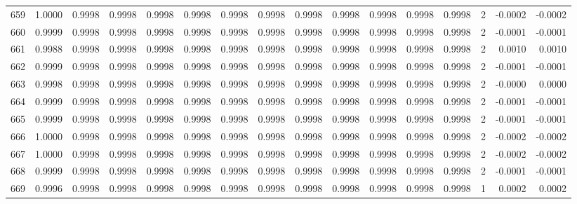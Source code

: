 \begin{tabular}{lrrrrrrrrrrrrrrr}
659 &      1.0000 &  0.9998 &  0.9998 &  0.9998 &  0.9998 &  0.9998 &  0.9998 &  0.9998 &  0.9998 &  0.9998 &   0.9998 &     0.9998 &      2 &                   -0.0002 &                    -0.0002 \\
660 &      0.9999 &  0.9998 &  0.9998 &  0.9998 &  0.9998 &  0.9998 &  0.9998 &  0.9998 &  0.9998 &  0.9998 &   0.9998 &     0.9998 &      2 &                   -0.0001 &                    -0.0001 \\
661 &      0.9988 &  0.9998 &  0.9998 &  0.9998 &  0.9998 &  0.9998 &  0.9998 &  0.9998 &  0.9998 &  0.9998 &   0.9998 &     0.9998 &      2 &                    0.0010 &                     0.0010 \\
662 &      0.9999 &  0.9998 &  0.9998 &  0.9998 &  0.9998 &  0.9998 &  0.9998 &  0.9998 &  0.9998 &  0.9998 &   0.9998 &     0.9998 &      2 &                   -0.0001 &                    -0.0001 \\
663 &      0.9998 &  0.9998 &  0.9998 &  0.9998 &  0.9998 &  0.9998 &  0.9998 &  0.9998 &  0.9998 &  0.9998 &   0.9998 &     0.9998 &      2 &                   -0.0000 &                     0.0000 \\
664 &      0.9999 &  0.9998 &  0.9998 &  0.9998 &  0.9998 &  0.9998 &  0.9998 &  0.9998 &  0.9998 &  0.9998 &   0.9998 &     0.9998 &      2 &                   -0.0001 &                    -0.0001 \\
665 &      0.9999 &  0.9998 &  0.9998 &  0.9998 &  0.9998 &  0.9998 &  0.9998 &  0.9998 &  0.9998 &  0.9998 &   0.9998 &     0.9998 &      2 &                   -0.0001 &                    -0.0001 \\
666 &      1.0000 &  0.9998 &  0.9998 &  0.9998 &  0.9998 &  0.9998 &  0.9998 &  0.9998 &  0.9998 &  0.9998 &   0.9998 &     0.9998 &      2 &                   -0.0002 &                    -0.0002 \\
667 &      1.0000 &  0.9998 &  0.9998 &  0.9998 &  0.9998 &  0.9998 &  0.9998 &  0.9998 &  0.9998 &  0.9998 &   0.9998 &     0.9998 &      2 &                   -0.0002 &                    -0.0002 \\
668 &      0.9999 &  0.9998 &  0.9998 &  0.9998 &  0.9998 &  0.9998 &  0.9998 &  0.9998 &  0.9998 &  0.9998 &   0.9998 &     0.9998 &      2 &                   -0.0001 &                    -0.0001 \\
669 &      0.9996 &  0.9998 &  0.9998 &  0.9998 &  0.9998 &  0.9998 &  0.9998 &  0.9998 &  0.9998 &  0.9998 &   0.9998 &     0.9998 &      1 &                    0.0002 &                     0.0002 \\

\end{tabular}
